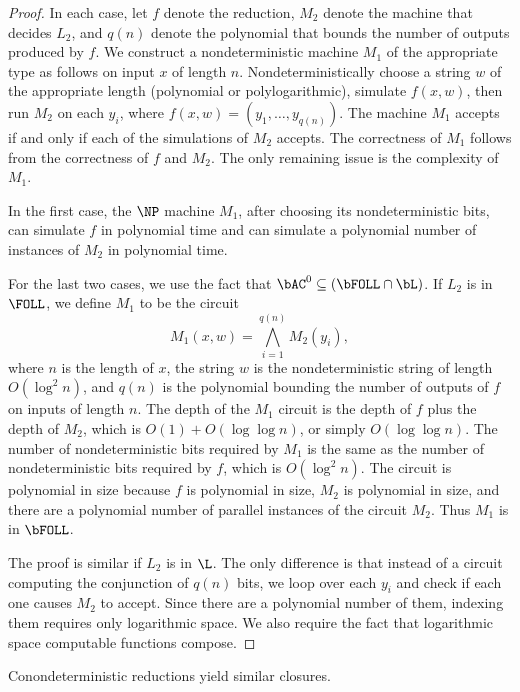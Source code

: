 \begin{proof}
  In each case, let $f$ denote the reduction, $M_2$ denote the machine that decides $L_2$, and $q(n)$ denote the polynomial that bounds the number of outputs produced by $f$.
  We construct a nondeterministic machine $M_1$ of the appropriate type as follows on input $x$ of length $n$.
  Nondeterministically choose a string $w$ of the appropriate length (polynomial or polylogarithmic), simulate $f(x, w)$, then run $M_2$ on each $y_i$, where $f(x, w) = (y_1, \dotsc, y_{q(n)})$.
  The machine $M_1$ accepts if and only if each of the simulations of $M_2$ accepts.
  The correctness of $M_1$ follows from the correctness of $f$ and $M_2$.
  The only remaining issue is the complexity of $M_1$.

  In the first case, the $\NP$ machine $M_1$, after choosing its nondeterministic bits, can simulate $f$ in polynomial time and can simulate a polynomial number of instances of $M_2$ in polynomial time.

  For the last two cases, we use the fact that $\bAC^0 \subseteq (\bFOLL \cap \bL)$.
  If $L_2$ is in $\FOLL$, we define $M_1$ to be the circuit
  \begin{equation*}
    M_1(x, w) = \bigwedge_{i = 1}^{q(n)} M_2(y_i),
  \end{equation*}
  where $n$ is the length of $x$, the string $w$ is the nondeterministic string of length $O(\log^2 n)$, and $q(n)$ is the polynomial bounding the number of outputs of $f$ on inputs of length $n$.
  The depth of the $M_1$ circuit is the depth of $f$ plus the depth of $M_2$, which is $O(1) + O(\log \log n)$, or simply $O(\log \log n)$.
  The number of nondeterministic bits required by $M_1$ is the same as the number of nondeterministic bits required by $f$, which is $O(\log^2 n)$.
  The circuit is polynomial in size because $f$ is polynomial in size, $M_2$ is polynomial in size, and there are a polynomial number of parallel instances of the circuit $M_2$.
  Thus $M_1$ is in $\bFOLL$.

  The proof is similar if $L_2$ is in $\L$.
  The only difference is that instead of a circuit computing the conjunction of $q(n)$ bits, we loop over each $y_i$ and check if each one causes $M_2$ to accept.
  Since there are a polynomial number of them, indexing them requires only logarithmic space.
  We also require the fact that logarithmic space computable functions compose.
\end{proof}

Conondeterministic reductions yield similar closures.

